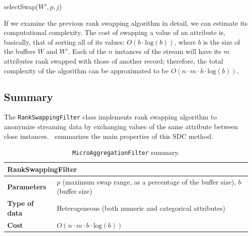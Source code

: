 \begin{procedure}
\caption{selectSwap($W',p,j$)\label{al:select-swap}}
\end{procedure}

If we examine the previous rank swapping algorithm in detail, we can estimate its computational complexity. The cost of swapping a value of an attribute is, basically, that of sorting all of its values: $O(b \cdot \mathrm{log}(b))$, where $b$ is the size of the buffers $W$ and $W'$. Each of the $n$ instances of the stream will have its $m$ attributes rank swapped with those of another record; therefore, the total complexity of the algorithm can be approximated to be $O(n \cdot m \cdot b \cdot \mathrm{log}(b))$.

\subsection{Summary}
\label{Implementation:RankSwapping:Summary}

The \texttt{RankSwappingFilter} class implements rank swapping algorithm to anonymize streaming data by exchanging values of the same attribute between close instances.~ summarizes the main properties of this SDC method.

\begin{table}[h]
	\centering
	\begin{tabular}{@{}ll@{}}
	\toprule
	\multicolumn{2}{l}{\textbf{RankSwappingFilter}}                             \\ \midrule
	\textbf{Parameters}   & $p$ (maximum swap range, as a percentage of the buffer size), $b$ (buffer size) \\
	\textbf{Type of data} & Heterogeneous (both numeric and categorical attributes) \\
	\textbf{Cost}         & $O(n \cdot m \cdot b \cdot \mathrm{log}(b))$  \\ \bottomrule
	\end{tabular}
	\caption{\texttt{MicroAggregationFilter} summary.}
	\label{table:rankswapping-summary}
\end{table}